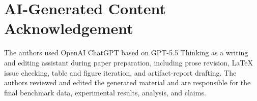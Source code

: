 \documentclass[10pt,conference]{IEEEtran}
\begin{document}
\section*{AI-Generated Content Acknowledgement}

The authors used OpenAI ChatGPT based on GPT-5.5 Thinking as a writing and editing assistant during paper preparation, including prose revision, LaTeX issue checking, table and figure iteration, and artifact-report drafting. The authors reviewed and edited the generated material and are responsible for the final benchmark data, experimental results, analysis, and claims.




\end{document}
